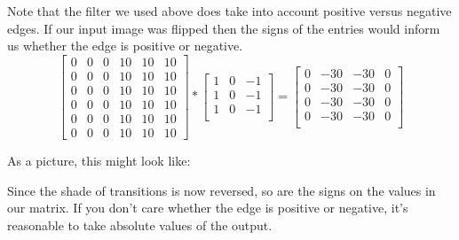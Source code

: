 \documentclass[12pt]{article}
\begin{document}
Note that the filter we used above does take into account positive versus negative edges. If our input image was flipped
then the signs of the entries would inform us whether the edge is positive or negative.
\begin{equation*}   \begin{bmatrix}
 0 & 0 & 0 & 10 & 10 & 10 \\
 0 & 0 & 0 & 10 & 10 & 10 \\
 0 & 0 & 0 & 10 & 10 & 10 \\
 0 & 0 & 0 & 10 & 10 & 10 \\
 0 & 0 & 0 & 10 & 10 & 10 \\
 0 & 0 & 0 & 10 & 10 & 10
  \end{bmatrix} 
  * 
  \begin{bmatrix}     
    1 & 0 & -1 \\     
    1 & 0 & -1 \\
    1 & 0 & -1 \\
  \end{bmatrix}
  =
  \begin{bmatrix}     0 & -30 & -30 & 0 \\
    0 & -30 & -30 & 0 \\
    0 & -30 & -30 & 0 \\
    0 & -30 & -30 & 0 \\
  \end{bmatrix} 
\end{equation*}

As a picture, this might look like:
\begin{figure}[h]
  \centering
\end{figure}

Since the shade of transitions is now reversed, so are the signs on the values
in our matrix. If you don't care whether the edge is positive or negative,
it's reasonable to take absolute values of the output.
\end{document}
